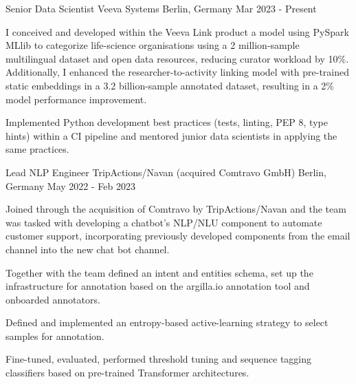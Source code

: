 

\begin{cventries}
  \cventry
    {Senior Data Scientist} %
    {Veeva Systems} %
    {Berlin, Germany} %
    {Mar 2023 - Present} %
	{
      \begin{cvitems} %
		\item {I conceived and developed within the Veeva Link product a model using PySpark MLlib to categorize life-science organisations using a 2 million-sample multilingual dataset and open data resources, reducing curator workload by 10\%. Additionally, I enhanced the researcher-to-activity linking model with pre-trained static embeddings in a 3.2 billion-sample annotated dataset, resulting in a 2\% model performance improvement.}
		\item {Implemented Python development best practices (tests, linting, PEP 8, type hints) within a CI pipeline and mentored junior data scientists in applying the same practices.}
      \end{cvitems}
    }

  \cventry
    {Lead NLP Engineer} %
    {TripActions/Navan (acquired Comtravo GmbH)} %
    {Berlin, Germany} %
    {May 2022 - Feb 2023} %
	{
      \begin{cvitems} %
		\item {Joined through the acquisition of Comtravo by TripActions/Navan and the team was tasked with developing a chatbot's NLP/NLU component to automate customer support, incorporating previously developed components from the email channel into the new chat bot channel.}
		\item {Together with the team defined an intent and entities schema, set up the infrastructure for annotation based on the argilla.io annotation tool and onboarded annotators.}
		\item {Defined and implemented an entropy-based active-learning strategy to select samples for annotation.}
		\item {Fine-tuned, evaluated, performed threshold tuning and sequence tagging classifiers based on pre-trained Transformer architectures.}
      \end{cvitems}
    }



\end{cventries}

